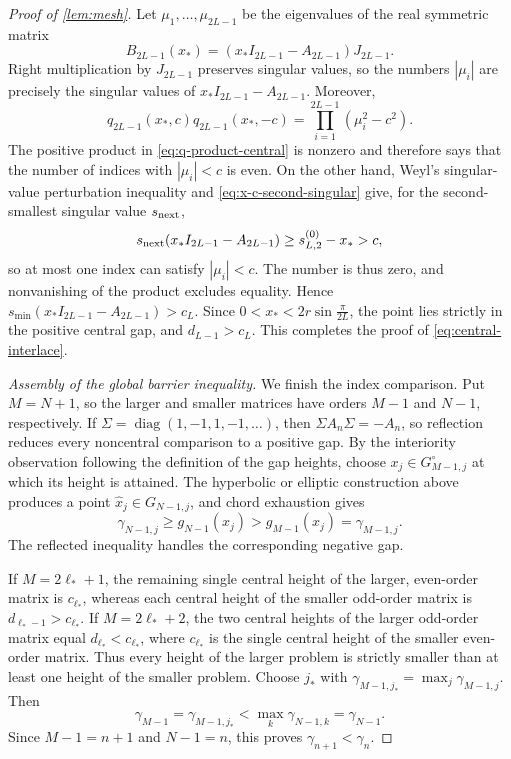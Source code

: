 \documentclass[review,hidelinks,onefignum,onetabnum]{siamart251216}
\DeclareMathOperator{\diag}{diag}
\begin{document}
\begin{proof}[Proof of \cref{lem:mesh}]
Let \(\mu_1,\ldots,\mu_{2L-1}\) be the eigenvalues of the real symmetric
matrix
\[
 B_{2L-1}(x_*)=(x_*I_{2L-1}-A_{2L-1})J_{2L-1}.
\]
Right multiplication by \(J_{2L-1}\) preserves singular values, so the
numbers \(|\mu_i|\) are precisely the singular values of
\(x_*I_{2L-1}-A_{2L-1}\).  Moreover,
\[
 q_{2L-1}(x_*,c)q_{2L-1}(x_*,-c)
 =\prod_{i=1}^{2L-1}(\mu_i^2-c^2).
\]
The positive product in \eqref{eq:q-product-central} is nonzero and
therefore says that the number of indices with \(|\mu_i|<c\) is
even.  On the other hand, Weyl's singular-value perturbation inequality
and \eqref{eq:x-c-second-singular} give, for the second-smallest singular
value \(s_{\rm next}\),
\[
 s_{\rm next}(x_*I_{2L-1}-A_{2L-1})
 \geq s_{L,2}^{(0)}-x_*>c,
\]
so at most one index can satisfy \(|\mu_i|<c\).  The number is thus
zero, and nonvanishing of the product excludes equality.  Hence
\(s_{\min}(x_*I_{2L-1}-A_{2L-1})>c_L\).  Since
\(0<x_*<2r\sin\frac{\pi}{2L}\), the point lies strictly in the positive
central gap, and \(d_{L-1}>c_L\).  This completes the proof of
\eqref{eq:central-interlace}.

\medskip\noindent\emph{Assembly of the global barrier inequality.}\quad
We finish the index comparison.  Put \(M=N+1\), so the larger and
smaller matrices have orders \(M-1\) and \(N-1\), respectively.  If
\(\Sigma=\diag(1,-1,1,-1,\ldots)\), then
\(\Sigma A_n\Sigma=-A_n\), so reflection reduces every noncentral
comparison to a positive gap.  By the interiority observation following the
definition of the gap heights, choose
\(x_j\in G_{M-1,j}^{\circ}\) at which its height is attained.  The hyperbolic
or elliptic construction above produces a point
\(\widehat x_j\in G_{N-1,j}\), and chord exhaustion gives
\[
 \gamma_{N-1,j}\geq g_{N-1}(\widehat x_j)
 >g_{M-1}(x_j)=\gamma_{M-1,j}.
\]
The reflected inequality handles the corresponding negative gap.

If \(M=2\ell_*+1\), the remaining single central height of the larger,
even-order matrix is \(c_{\ell_*}\), whereas each central height of the
smaller odd-order matrix is \(d_{\ell_*-1}>c_{\ell_*}\).  If
\(M=2\ell_*+2\), the two central heights of the larger odd-order matrix
equal \(d_{\ell_*}<c_{\ell_*}\), where \(c_{\ell_*}\) is the single
central height of the smaller even-order matrix.
Thus every height of the larger problem is strictly smaller than at
least one height of the smaller problem.  Choose \(j_*\) with
\(\gamma_{M-1,j_*}=\max_j\gamma_{M-1,j}\).  Then
\[
 \gamma_{M-1}=\gamma_{M-1,j_*}
 <\max_k\gamma_{N-1,k}=\gamma_{N-1}.
\]
Since \(M-1=n+1\) and \(N-1=n\), this proves
\(\gamma_{n+1}<\gamma_n\).
\end{proof}
\end{document}
